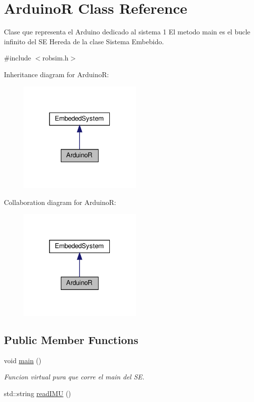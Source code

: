 \hypertarget{classArduinoR}{}\section{ArduinoR Class Reference}
\label{classArduinoR}


Clase que representa el Arduino dedicado al sistema 1 El metodo main es el bucle infinito del SE Hereda de la clase Sistema Embebido.  




{\ttfamily \#include $<$robsim.\+h$>$}



Inheritance diagram for ArduinoR\+:
\nopagebreak
\begin{figure}[H]
\begin{center}
\leavevmode
\includegraphics[width=172pt]{classArduinoR__inherit__graph}
\end{center}
\end{figure}


Collaboration diagram for ArduinoR\+:
\nopagebreak
\begin{figure}[H]
\begin{center}
\leavevmode
\includegraphics[width=172pt]{classArduinoR__coll__graph}
\end{center}
\end{figure}
\subsection*{Public Member Functions}
\begin{DoxyCompactItemize}
\item 
void \hyperlink{classArduinoR_a479b06fd9527e9810b37b91da8fb0f7e}{main} ()
\begin{DoxyCompactList}\small\item\em Funcion virtual pura que corre el main del SE. \end{DoxyCompactList}\item 
std\+::string \hyperlink{classArduinoR_a8365ffa8bde5c67337aa9b31fe08f83f}{read\+I\+MU} ()
\end{DoxyCompactItemize}


